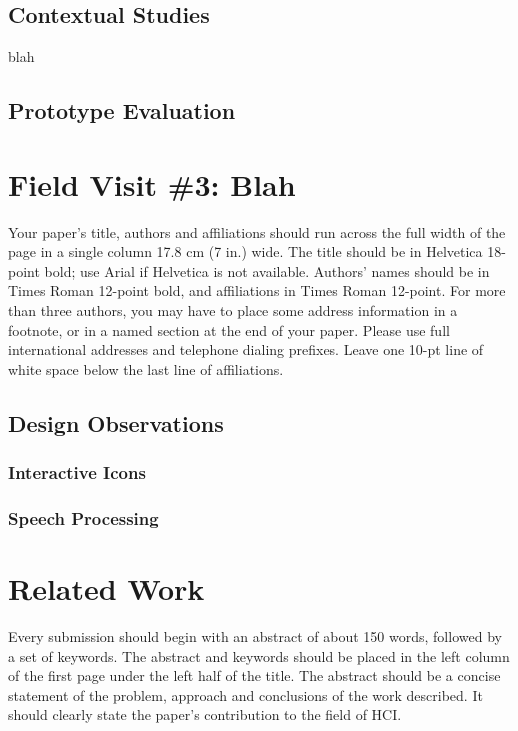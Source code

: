 \documentclass{sigchi}
\begin{document}
\subsection{Contextual Studies}
blah

\subsection{Prototype Evaluation}

\section{Field Visit \#3: Blah}

Your paper's title, authors and affiliations should run across the
full width of the page in a single column 17.8 cm (7 in.) wide.  The
title should be in Helvetica 18-point bold; use Arial if Helvetica is
not available.  Authors' names should be in Times Roman 12-point bold,
and affiliations in Times Roman 12-point.  For more than three authors,
you may have to place some address information in a footnote, or in a named
section at the end of your paper. Please use full international addresses and
telephone dialing prefixes.  Leave one 10-pt line of white space below the last
line of affiliations.

\subsection{Design Observations}

\subsubsection{Interactive Icons}

\subsubsection{Speech Processing}

\section{Related Work}

Every submission should begin with an abstract of about 150 words,
followed by a set of keywords. The abstract and keywords should be
placed in the left column of the first page under the left half of the
title. The abstract should be a concise statement of the problem,
approach and conclusions of the work described.  It should clearly
state the paper's contribution to the field of HCI.
\end{document}

